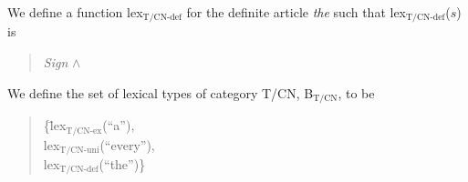 We define a function lex$_{\mathrm{T/CN}\textrm{-}\mathrm{def}}$ for
the definite article
\textit{the}  such that
lex$_{\mathrm{T/CN}\textrm{-}\mathrm{def}}$($s$) is
\begin{quote}
\hspace*{-12em}\textit{Sign} \d{$\wedge$} \\
\hspace*{-12em}

\end{quote}

We define the set of lexical types of category T/CN,
B$_{\mathrm{T/CN}}$, to be
\begin{quote}
\begin{tabbing}
\{\=lex$_{\mathrm{T/CN}\textrm{-}\mathrm{ex}}$(``a''), \\
  \>lex$_{\mathrm{T/CN}\textrm{-}\mathrm{uni}}$(``every''), \\
  \>lex$_{\mathrm{T/CN}\textrm{-}\mathrm{def}}$(``the'')\}
\end{tabbing}
\end{quote}




